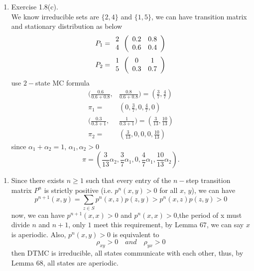 \documentclass[12pt]{article}
\theoremstyle{remark}
\theoremstyle{definition}
\numberwithin{figure}{section}
\begin{document}
\begin{enumerate}[\textbf{1.}]
  \item 
Exercise 1.8(c). \\
We know irreducible sets are $\big\{2,4\big\}$ and $\big\{1,5\big\}$, we can have transition matrix and stationary distribution as below
\begin{align*}
P_1 = \begin{array}{c} 2\\ 4 \end{array}\left( \begin{array}{ c c}
 0.2 & 0.8\\
 0.6 & 0.4 
\end{array}\right)
\end{align*}
\begin{align*}
P_2 = \begin{array}{c} 1\\ 5 \end{array}\left( \begin{array}{ c c}
 0 & 1\\
 0.3 & 0.7 
\end{array}\right)
\end{align*}
use $2-$state MC formula
\begin{equation*}
\begin{align*}
     (\frac{0.6}{0.6+0.8},&\frac{0.8}{0.6+0.8})=(\frac{3}{7},\frac{4}{7})\\
     \pi_1 =& (0,\frac{3}{7},0,\frac{4}{7},0)\\
    (\frac{0.3}{0.3+1},&\frac{1}{0.3+1})=(\frac{3}{13},\frac{10}{13})\\
    \pi_2 = &(\frac{3}{13},0,0,0,\frac{10}{13})
 \end{align*}
\end{equation*}
since $\alpha_1 +\alpha_2 =1$, $\alpha_1, \alpha_2 >0$
\begin{equation*}
    \pi = (\frac{3}{13}\alpha_2,\frac{3}{7}\alpha _1,0,\frac{4}{7}\alpha_1,\frac{10}{13}\alpha_2).
\end{equation*}
\end{enumerate}
\pagebreak

\vspace{.1in}

\begin{enumerate}[\textbf{2.}]
  \item
Since there exists $n \geq 1$ such that every entry of the $n-$step transition matrix $P^{n}$ is strictly positive (i.e. $p^{n}(x, y) > 0$ for all $x$, $y$), we can have 
\begin{equation*}
    p^{n+1}(x,y)= \sum_{z\in S}p^{n}(x,z)p(z,y)> p^{n}(x,z)p(z,y)>0
\end{equation*}
now, we can have $ p^{n+1}(x,x)>0$ and $ p^{n}(x,x)>0$,the period of x must divide $n$ and $n+1$, only $1$ meet this requirement, by Lemma $67$, we can say $x$ is aperiodic. Also, $p^{n}(x, y) > 0$ is equivalent to 
\begin{equation*}
    \rho_{xy} >0 \quad and \quad \rho_{yx} >0
\end{equation*}
then DTMC is irreducible, all states communicate with each other, thus, by Lemma 68, all states are aperiodic.
\end{enumerate}
\end{document}
